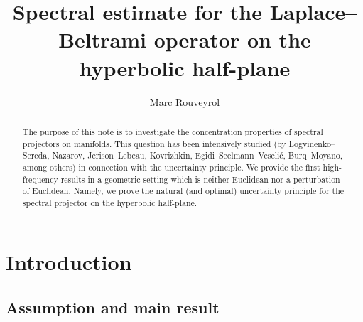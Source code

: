 \documentclass[letterpaper,11pt]{amsart}
\title[Spectral estimate on the hyperbolic half-plane]{Spectral estimate for the Laplace--Beltrami operator on the hyperbolic half-plane}
\author{Marc Rouveyrol}
\theoremstyle{note}
\numberwithin{equation}{section}
\begin{document}
\begin{abstract}
The purpose of this note is to investigate the concentration properties of spectral projectors on manifolds.
This question has been intensively studied (by Logvinenko--Sereda, Nazarov, Jerison--Lebeau, Kovrizhkin, Egidi--Seelmann--Veseli{\'c}, Burq--Moyano, among others) in connection with the uncertainty principle. 
We provide the first high-frequency results in a geometric setting which is neither Euclidean nor a perturbation of Euclidean.
Namely, we prove the natural (and optimal) uncertainty principle for the spectral projector on the hyperbolic half-plane.
\end{abstract}


\maketitle
\tableofcontents

\newpage

\section{Introduction}

\subsection{Assumption and main result}
\end{document}
